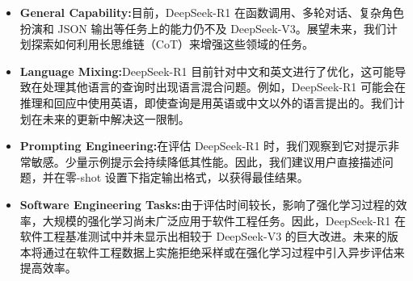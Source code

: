 \documentclass[lang=cn,a4paper,newtx]{elegantpaper}
\newcommand{\dsri}{DeepSeek-R1}
\begin{document}
\begin{itemize}[topsep=0pt]
  \item \textbf{General Capability:}目前，\dsri{} 在函数调用、多轮对话、复杂角色扮演和 JSON 输出等任务上的能力仍不及 DeepSeek-V3。展望未来，我们计划探索如何利用长思维链（CoT）来增强这些领域的任务。
  \item \textbf{Language Mixing:}\dsri{} 目前针对中文和英文进行了优化，这可能导致在处理其他语言的查询时出现语言混合问题。例如，\dsri{} 可能会在推理和回应中使用英语，即使查询是用英语或中文以外的语言提出的。我们计划在未来的更新中解决这一限制。
  \item \textbf{Prompting Engineering:}在评估 \dsri{} 时，我们观察到它对提示非常敏感。少量示例提示会持续降低其性能。因此，我们建议用户直接描述问题，并在零-shot 设置下指定输出格式，以获得最佳结果。
  \item  \textbf{Software Engineering Tasks:}由于评估时间较长，影响了强化学习过程的效率，大规模的强化学习尚未广泛应用于软件工程任务。因此，DeepSeek-R1 在软件工程基准测试中并未显示出相较于 DeepSeek-V3 的巨大改进。未来的版本将通过在软件工程数据上实施拒绝采样或在强化学习过程中引入异步评估来提高效率。
\end{itemize}
\end{document}

